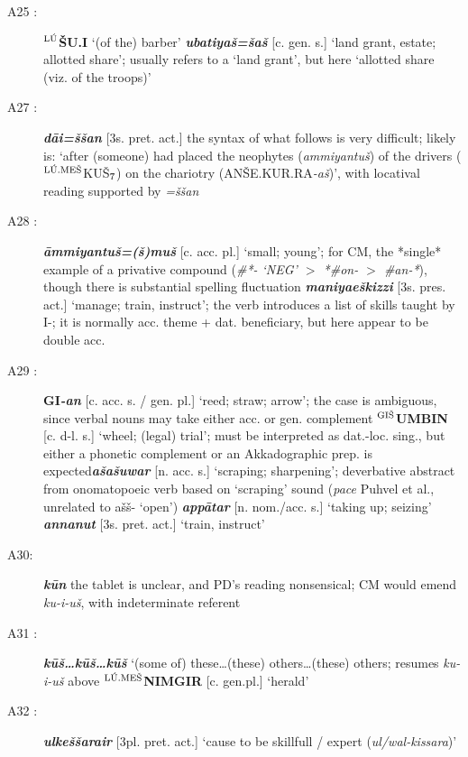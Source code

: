\documentclass[10pt]{article}
\newcommand{\supersc}[1]{$^{\textrm{\scriptsize{#1}}}$}  	%
\newcommand{\subsc}[1]{$_{\textrm{\scriptsize{#1}}}$}	%
\newcommand{\bit}[1]{\textbf{\textit{#1}}}				%
\newcommand{\p}[1]{{\tiny[{#1}]}}					%
\newcommand{\hith}{\textsubwedge{h}}
\newcommand{\man}{\supersc{L\'U}}
\newcommand{\men}{\supersc{L\'U.ME\v{S}}}
\newcommand{\wood}{\supersc{GI\v{S}}}
\renewcommand{\.}[1]{\textsubdot{#1}}
\begin{document}
\begin{description}
\item[A25 :] \textbf{{\man}\v{S}U.I} `(of the) barber' \bit{ubatiya\v{s}=\v{s}a\v{s}} \p{c. gen. s.} `land grant, estate; allotted share'; usually refers to a `land grant', but here `allotted share (viz. of the troops)'

\item[A27 :] \bit{d\=ai=\v{s}\v{s}an} \p{3s. pret. act.} the syntax of what follows is very difficult; likely is: `after (someone) had placed the neophytes (\textit{ammiyantu\v{s}}) of the drivers ({\men}KU\v{S}\subsc{7}) on the chariotry (AN\v{S}E.KUR.RA\textit{-a\v{s}})', with locatival reading supported by \textit{=\v{s}\v{s}an}

\item[A28 :] \bit{\=ammiyantu\v{s}=(\v{s})mu\v{s}} \p{c. acc. pl.} `small; young'; for CM, the {*}single{*} example of a privative compound (\textit{\#*- `NEG' $>$ *\#on- $>$ \#an-*}), though there is substantial spelling fluctuation  \bit{maniya{\hith\hith}e\v{s}kizzi} \p{3s. pres. act.} `manage; train, instruct'; the verb introduces a list of skills taught by I-; it is normally acc. theme + dat. beneficiary, but here appear to be double acc.

\item[A29 :] \textbf{GI}\bit{-an} \p{c. acc. s. / gen. pl.} `reed; straw; arrow'; the case is ambiguous, since verbal nouns may take either acc. or gen. complement \textbf{{\wood}UMBIN} \p{c. d-l. s.} `wheel; (legal) trial'; must be interpreted as dat.-loc. sing., but either a phonetic complement or an Akkadographic prep. is expected\bit{{\hith}a\v{s}{\hith}a\v{s}uwar} \p{n. acc. s.} `scraping; sharpening'; deverbative abstract from onomatopoeic verb based on `scraping' sound (\textit{pace} Puhvel et al., unrelated to {\hith}a\v{s}\v{s}- `open') \bit{app\=atar} \p{n. nom./acc. s.} `taking up; seizing' \bit{annanut} \p{3s. pret. act.} `train, instruct'

\item[A30: ] \bit{k\=un} the tablet is unclear, and PD's reading nonsensical; CM would emend \textit{ku-i-u\v{s}}, with indeterminate referent

\item[A31 :] \bit{k\=u\v{s}{\ldots}k\=u\v{s}{\ldots}k\=u\v{s}} `(some of) these{\ldots}(these) others{\ldots}(these) others; resumes \textit{ku-i-u\v{s}} above \textbf{{\men}NIMGIR} \p{c. gen.pl.} `herald'

\item[A32 :] \bit{ulke\v{s}\v{s}ara{\hith\hith}ir} \p{3pl. pret. act.} `cause to be skillfull / expert (\textit{ul/wal-kissara})'


\end{description}
\end{document}
